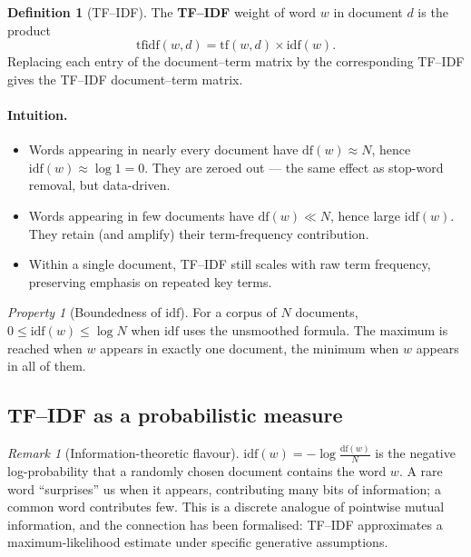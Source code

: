 \documentclass[12pt,a4paper]{report}
\theoremstyle{definition}
\newtheorem{definition}{Definition}[section]
\theoremstyle{remark}
\newtheorem{remark}{Remark}[section]
\newtheorem{property}{Property}[section]
\begin{document}
\begin{definition}[TF--IDF]
The \textbf{TF--IDF} weight of word $w$ in document $d$ is the product
\[ \mathrm{tfidf}(w, d) = \mathrm{tf}(w, d) \times \mathrm{idf}(w). \]
Replacing each entry of the document--term matrix by the corresponding TF--IDF gives the TF--IDF document--term matrix.
\end{definition}

\paragraph{Intuition.}
\begin{itemize}
    \item Words appearing in nearly every document have $\mathrm{df}(w) \approx N$, hence $\mathrm{idf}(w) \approx \log 1 = 0$. They are zeroed out --- the same effect as stop-word removal, but data-driven.
    \item Words appearing in few documents have $\mathrm{df}(w) \ll N$, hence large $\mathrm{idf}(w)$. They retain (and amplify) their term-frequency contribution.
    \item Within a single document, TF--IDF still scales with raw term frequency, preserving emphasis on repeated key terms.
\end{itemize}

\begin{property}[Boundedness of $\mathrm{idf}$]
For a corpus of $N$ documents, $0 \le \mathrm{idf}(w) \le \log N$ when $\mathrm{idf}$ uses the unsmoothed formula. The maximum is reached when $w$ appears in exactly one document, the minimum when $w$ appears in all of them.
\end{property}

\subsection{TF--IDF as a probabilistic measure}

\begin{remark}[Information-theoretic flavour]
$\mathrm{idf}(w) = -\log \frac{\mathrm{df}(w)}{N}$ is the negative log-probability that a randomly chosen document contains the word $w$. A rare word ``surprises'' us when it appears, contributing many bits of information; a common word contributes few. This is a discrete analogue of pointwise mutual information, and the connection has been formalised: TF--IDF approximates a maximum-likelihood estimate under specific generative assumptions.
\end{remark}
\end{document}
